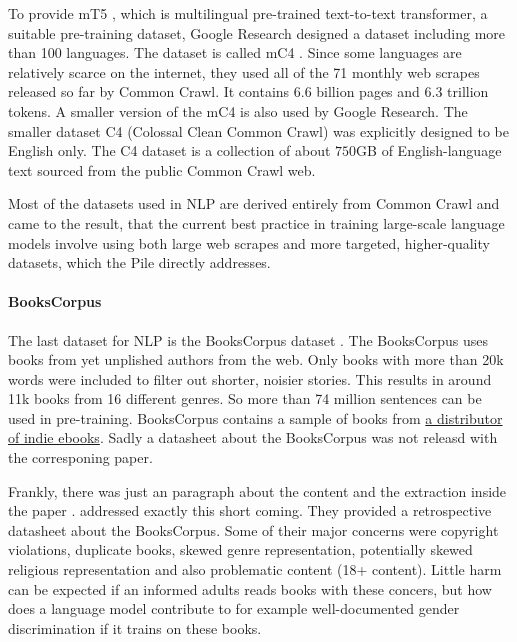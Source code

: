 \documentclass[
]{krantz}
\begin{document}
To provide mT5 \citep{xue2020mt5}, which is multilingual pre-trained text-to-text transformer, a suitable pre-training dataset, Google Research designed a dataset including more than 100 languages. The dataset is called mC4 \citep{xue2020mt5}. Since some languages are relatively scarce on the internet, they used all of the 71 monthly web scrapes released so far by Common Crawl. It contains 6.6 billion pages and 6.3 trillion tokens. A smaller version of the mC4 is also used by Google Research. The smaller dataset C4 (Colossal Clean Common Crawl) was explicitly designed to be English only. The C4 dataset is a collection of about \(750\)GB of English-language text sourced from the public Common Crawl web.

Most of the datasets used in NLP are derived entirely from Common Crawl and \citet{rosset2020turing} came to the result, that the current best practice in training large-scale language models involve using both large web scrapes and more targeted, higher-quality datasets, which the Pile directly addresses.

\hypertarget{bookscorpus}{%
\paragraph{BooksCorpus}\label{bookscorpus}}

The last dataset for NLP is the BooksCorpus dataset \citep{zhu2015aligning}. The BooksCorpus uses books from yet unplished authors from the web. Only books with more than 20k words were included to filter out shorter, noisier stories. This results in around 11k books from 16 different genres. So more than 74 million sentences can be used in pre-training. BooksCorpus contains a sample of books from \href{https://www.smashwords.com}{a distributor of indie ebooks}. Sadly a datasheet about the BooksCorpus was not releasd with the corresponing paper.

Frankly, there was just an paragraph about the content and the extraction inside the paper \citep{zhu2015aligning}. \citet{bandy2021addressing} addressed exactly this short coming. They provided a retrospective datasheet about the BooksCorpus. Some of their major concerns were copyright violations, duplicate books, skewed genre representation, potentially skewed religious representation and also problematic content (18+ content). Little harm can be expected if an informed adults reads books with these concers, but how does a language model contribute to for example well-documented gender discrimination if it trains on these books.
\end{document}
